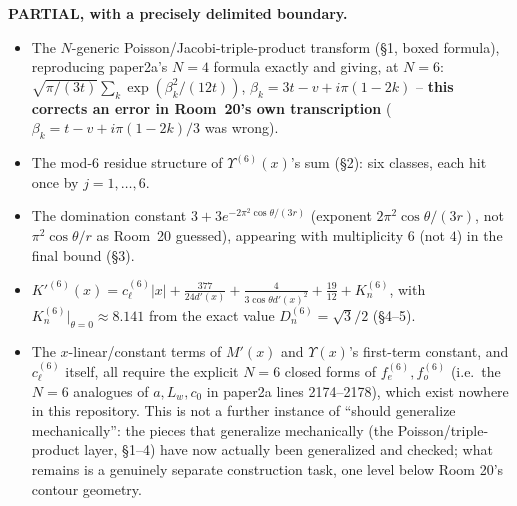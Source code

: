 \documentclass[11pt]{article}
\begin{document}
\textbf{PARTIAL, with a precisely delimited boundary.}
\begin{itemize}
\item[DERIVED AND VERIFIED] The $N$-generic Poisson/Jacobi-triple-product transform (\S1, boxed
formula), reproducing paper2a's $N=4$ formula exactly and giving, at $N=6$: $\sqrt{\pi/(3t)}
\sum_k\exp(\beta_k^2/(12t))$, $\beta_k=3t-v+i\pi(1-2k)$ -- \textbf{this corrects an error in
Room~20's own transcription} ($\beta_k=t-v+i\pi(1-2k)/3$ was wrong).
\item[DERIVED AND VERIFIED] The mod-6 residue structure of $\Upsilon^{(6)}(x)$'s sum (\S2): six
classes, each hit once by $j=1,\dots,6$.
\item[DERIVED AND VERIFIED] The domination constant $3+3e^{-2\pi^2\cos\theta/(3r)}$ (exponent
$2\pi^2\cos\theta/(3r)$, not $\pi^2\cos\theta/r$ as Room~20 guessed), appearing with multiplicity
$6$ (not $4$) in the final bound (\S3).
\item[DERIVED AND VERIFIED] $K'^{(6)}(x)=c_\ell^{(6)}|x|+\frac{377}{24d'(x)}+\frac4{3\cos\theta
d'(x)^2}+\frac{19}{12}+K_n^{(6)}$, with $K_n^{(6)}|_{\theta=0}\approx8.141$ from the exact value
$D_n^{(6)}=\sqrt3/2$ (\S4--5).
\item[BLOCKED, precisely located] The $x$-linear/constant terms of $M'(x)$ and $\Upsilon(x)$'s
first-term constant, and $c_\ell^{(6)}$ itself, all require the explicit $N=6$ closed forms of
$f_e^{(6)},f_o^{(6)}$ (i.e.\ the $N=6$ analogues of $a,L_w,c_0$ in paper2a lines 2174--2178), which
exist nowhere in this repository. This is not a further instance of ``should generalize
mechanically'': the pieces that generalize mechanically (the Poisson/triple-product layer, \S1--4)
have now actually been generalized and checked; what remains is a genuinely separate construction
task, one level below Room 20's contour geometry.
\end{itemize}
\end{document}
